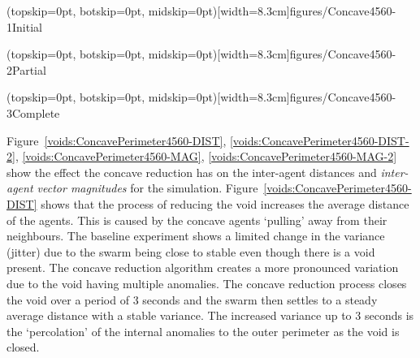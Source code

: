 \documentclass{ieeeaccess}
\begin{document}
\Figure[t!](topskip=0pt, botskip=0pt, midskip=0pt)[width=8.3cm]{figures/Concave4560-1}{Initial\label{fig:VoidConcaveReduction1}}

\Figure[t!](topskip=0pt, botskip=0pt, midskip=0pt)[width=8.3cm]{figures/Concave4560-2}{Partial\label{fig:VoidConcaveReduction2}}

\Figure[t!](topskip=0pt, botskip=0pt, midskip=0pt)[width=8.3cm]{figures/Concave4560-3}{Complete\label{fig:VoidConcaveReduction3}}

Figure~\ref{voids:ConcavePerimeter4560-DIST}, \ref{voids:ConcavePerimeter4560-DIST-2}, \ref{voids:ConcavePerimeter4560-MAG}, \ref{voids:ConcavePerimeter4560-MAG-2} show the effect the concave reduction has on the inter-agent distances and \textit{inter-agent vector magnitudes} for the simulation. 
Figure~\ref{voids:ConcavePerimeter4560-DIST} shows that the process of reducing the void increases the average distance of the agents. This is caused by the concave agents `pulling' away from their neighbours. The baseline experiment shows a limited change in the variance (jitter) due to the swarm being close to stable even though there is a void present. 
The concave reduction algorithm creates a more pronounced variation due to the void having multiple anomalies. The concave reduction process closes the void over a period of 3 seconds and the swarm then settles to a steady average distance with a stable variance. The increased variance up to 3 seconds is the `percolation' of the internal anomalies to the outer perimeter as the void is closed.
\end{document}
